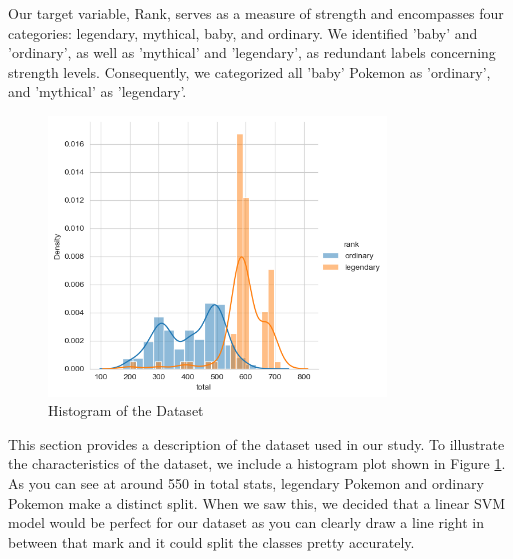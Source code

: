 \documentclass[11pt, letterpaper]{report}
\begin{document}
Our target variable, Rank, serves as a measure of strength and encompasses four categories: legendary, mythical, baby, and ordinary. We identified 'baby' and 'ordinary', as well as 'mythical' and 'legendary', as redundant labels concerning strength levels. Consequently, we categorized all 'baby' Pokemon as 'ordinary', and 'mythical' as 'legendary'.
    \begin{figure}[H]
        \centering
        \includegraphics[width=0.8\textwidth]{histplot.png} %
        \caption{Histogram of the Dataset}
        \label{fig:dataset-hist}
    \end{figure}
  This section provides a description of the dataset used in our study. To illustrate the characteristics of the dataset, we include a histogram plot shown in Figure \ref{fig:dataset-hist}. As you can see at around 550 in total stats, legendary Pokemon and ordinary Pokemon make a distinct split. When we saw this, we decided that a linear SVM model would be perfect for our dataset as you can clearly draw a line right in between that mark and it could split the classes pretty accurately. 
\end{document}
